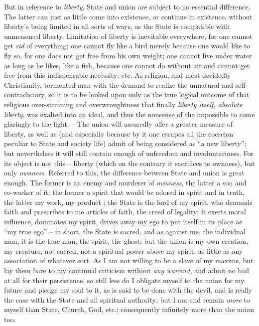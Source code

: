 \documentclass[12pt,a4paper]{book}
\begin{document}
 But in reference to \textit{liberty}, State and union are subject to no 
essential difference. The latter can just as little come into existence, or 
continue in existence, without liberty's being limited in all sorts of ways, 
as the State is compatible with unmeasured liberty. Limitation of liberty is 
inevitable everywhere, for one cannot get \textit{rid} of everything; one 
cannot fly like a bird merely because one would like to fly so, for one does 
not get free from his own weight; one cannot live under water as long as he 
likes, like a fish, because one cannot do without air and cannot get free from 
this indispensable necessity; etc. As religion, and most decidedly 
Christianity, tormented man with the demand to realize the unnatural and self- 
contradictory, so it is to be looked upon only as the true logical outcome of 
that religious over-straining and overwroughtness that finally \textit{liberty 
itself, absolute liberty}, was exalted into an ideal, and thus the nonsense of 
the impossible to come glaringly to the light. -- The union will assuredly 
offer a greater measure of liberty, as well as (and especially because by it 
one escapes all the coercion peculiar to State and society life) admit of 
being considered as ``a new liberty''; but nevertheless it will still 
contain enough of unfreedom and involuntariness. For its object is not this -- 
liberty (which on the contrary it sacrifices to ownness), but only 
\textit{ownness}. Referred to this, the difference between State and union is 
great enough. The former is an enemy and murderer of \textit{ownness}, the 
latter a son and co-worker of it; the former a spirit that would be adored in 
spirit and in truth, the latter my work, my product ; the State is the lord of 
my spirit, who demands faith and prescribes to me articles of faith, the creed 
of legality; it exerts moral influence, dominates my spirit, drives away my 
ego to put itself in its place as ``my true ego'' -- in short, the State is 
sacred, and as against me, the individual man, it is the true man, the spirit, 
the ghost; but the union is my own creation, my creature, not sacred, not a 
spiritual power above my spirit, as little as any association of whatever 
sort. As I am not willing to be a slave of my maxims, but lay them bare to my 
continual criticism without \textit{any warrant}, and admit no bail at all for 
their persistence, so still less do I obligate myself to the union for my 
future and pledge my soul to it, as is said to be done with the devil, and is 
really the case with the State and all spiritual authority; but I am and 
remain \textit{more} to myself than State, Church, God, etc.; consequently 
infinitely more than the union too.
\end{document}

